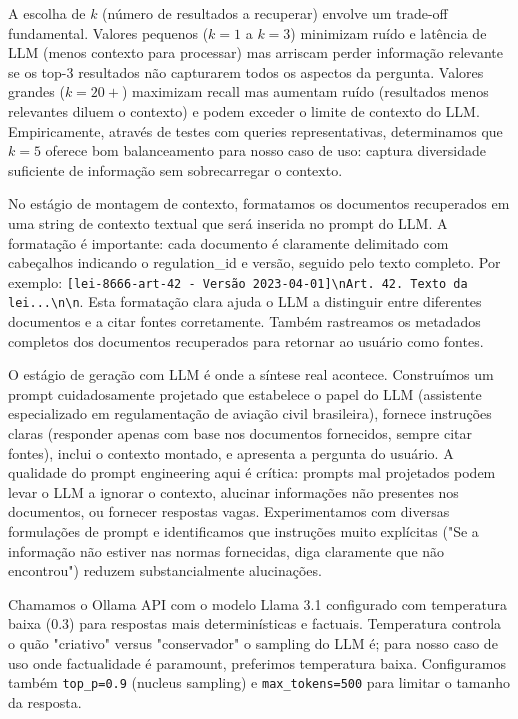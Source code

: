 \documentclass[12pt,a4paper]{article}
\begin{document}
A escolha de $k$ (número de resultados a recuperar) envolve um trade-off fundamental. Valores pequenos ($k=1$ a $k=3$) minimizam ruído e latência de LLM (menos contexto para processar) mas arriscam perder informação relevante se os top-3 resultados não capturarem todos os aspectos da pergunta. Valores grandes ($k=20+$) maximizam recall mas aumentam ruído (resultados menos relevantes diluem o contexto) e podem exceder o limite de contexto do LLM. Empiricamente, através de testes com queries representativas, determinamos que $k=5$ oferece bom balanceamento para nosso caso de uso: captura diversidade suficiente de informação sem sobrecarregar o contexto.

No estágio de montagem de contexto, formatamos os documentos recuperados em uma string de contexto textual que será inserida no prompt do LLM. A formatação é importante: cada documento é claramente delimitado com cabeçalhos indicando o regulation\_id e versão, seguido pelo texto completo. Por exemplo: \texttt{[lei-8666-art-42 - Versão 2023-04-01]\textbackslash nArt. 42. Texto da lei...\textbackslash n\textbackslash n}. Esta formatação clara ajuda o LLM a distinguir entre diferentes documentos e a citar fontes corretamente. Também rastreamos os metadados completos dos documentos recuperados para retornar ao usuário como fontes.

O estágio de geração com LLM é onde a síntese real acontece. Construímos um prompt cuidadosamente projetado que estabelece o papel do LLM (assistente especializado em regulamentação de aviação civil brasileira), fornece instruções claras (responder apenas com base nos documentos fornecidos, sempre citar fontes), inclui o contexto montado, e apresenta a pergunta do usuário. A qualidade do prompt engineering aqui é crítica: prompts mal projetados podem levar o LLM a ignorar o contexto, alucinar informações não presentes nos documentos, ou fornecer respostas vagas. Experimentamos com diversas formulações de prompt e identificamos que instruções muito explícitas ("Se a informação não estiver nas normas fornecidas, diga claramente que não encontrou") reduzem substancialmente alucinações.

Chamamos o Ollama API com o modelo Llama 3.1 configurado com temperatura baixa (0.3) para respostas mais determinísticas e factuais. Temperatura controla o quão "criativo" versus "conservador" o sampling do LLM é; para nosso caso de uso onde factualidade é paramount, preferimos temperatura baixa. Configuramos também \texttt{top\_p=0.9} (nucleus sampling) e \texttt{max\_tokens=500} para limitar o tamanho da resposta.
\end{document}
